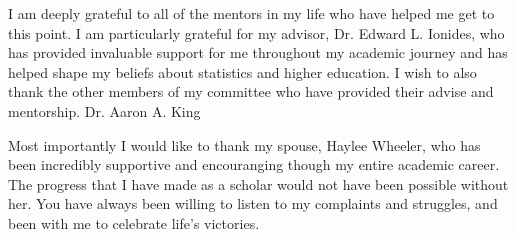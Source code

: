 I am deeply grateful to all of the mentors in my life who have helped me get to this point.
I am particularly grateful for my advisor, Dr. Edward L. Ionides, who has provided invaluable support for me throughout my academic journey and has helped shape my beliefs about statistics and higher education.
I wish to also thank the other members of my committee who have provided their advise and mentorship. 
Dr. Aaron A. King 

Most importantly I would like to thank my spouse, Haylee Wheeler, who has been incredibly supportive and encouranging though my entire academic career.
The progress that I have made as a scholar would not have been possible without her.
You have always been willing to listen to my complaints and struggles, and been with me to celebrate life's victories.
